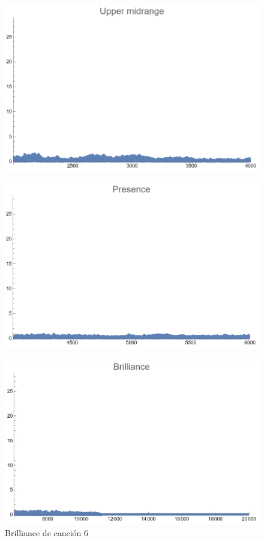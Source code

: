 \documentclass[12pt, letterpaper]{article}
\begin{document}
\begin{figure}[H]
  \centering
  \begin{minipage}{.5\textwidth}
    \centering
    \includegraphics[width=.9\linewidth]{imgs/Cancion6/upmid.png}
    \label{fig:06f}
  \end{minipage}%
  \begin{minipage}{.5\textwidth}
    \centering
    \includegraphics[width=.9\linewidth]{imgs/Cancion6/presence.png}
    \label{fig:06g}
  \end{minipage}
\end{figure}
\begin{figure}[H]
  \centering
  \includegraphics[width=.45\linewidth]{imgs/Cancion6/brilliance.png}
  \caption{Brilliance de canción 6}
  \label{fig:06h}
\end{figure}
\end{document}
